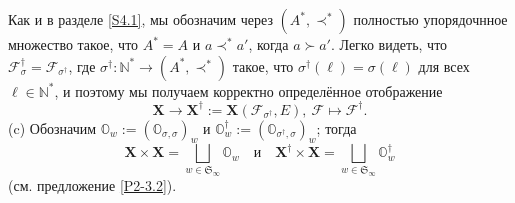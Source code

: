 \documentclass{amsart}
\theoremstyle{definition}
\newcommand{\NN}{\mathbb{N}^*}
\begin{document}
Как и в разделе \ref{S4.1}, мы обозначим через $(A^*,\prec^*)$ полностью упорядочнное множество
такое, что $A^*=A$ и $a\prec^*a'$, когда $a\succ a'$.
Легко видеть, что $\mathcal{F}_\sigma^\dag=\mathcal{F}_{\sigma^\dag}$,
где $\sigma^\dag:\NN\to(A^*,\prec^*)$ такое, что $\sigma^\dag(\ell)=\sigma(\ell)$ для всех $\ell\in\NN$, и поэтому мы получаем корректно определённое отображение
\[\mathbf{X}\to\mathbf{X}^\dag:=\mathbf{X}(\mathcal{F}_{\sigma^\dag},E),\ \mathcal{F}\mapsto\mathcal{F}^\dag.\]
{\rm (c)}
Обозначим $\pmb{\mathbb{O}}_w:=(\pmb{\mathbb{O}}_{\sigma,\sigma})_w$ и
$\pmb{\mathbb{O}}_w^\dag:=(\pmb{\mathbb{O}}_{\sigma^\dag,\sigma})_w$; тогда
\[\mathbf{X}\times\mathbf{X}=\bigsqcup_{w\in\mathfrak{S}_\infty}\pmb{\mathbb{O}}_w
\quad\mbox{и}\quad
\mathbf{X}^\dag\times\mathbf{X}=\bigsqcup_{w\in\mathfrak{S}_\infty}\pmb{\mathbb{O}}^\dag_w
\]
(см. предложение \ref{P2-3.2}).
\end{document}
